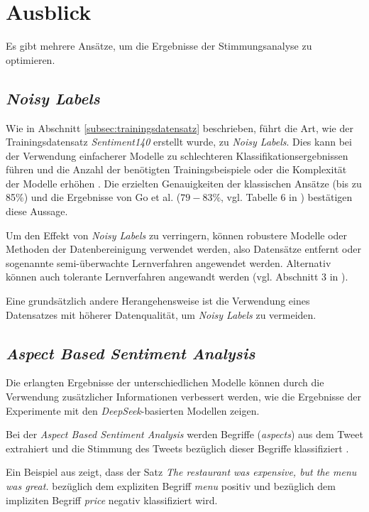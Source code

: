 \section{Ausblick}\label{sec:ausblick}

Es gibt mehrere Ansätze, um die Ergebnisse der Stimmungsanalyse zu optimieren.

\subsection{\textit{Noisy Labels}}
Wie in Abschnitt \ref{subsec:trainingsdatensatz} beschrieben, führt die Art, wie der Trainingsdatensatz \textit{Sentiment140} erstellt wurde, zu \textit{Noisy Labels}.
Dies kann bei der Verwendung einfacherer Modelle zu schlechteren Klassifikationsergebnissen führen und die Anzahl der benötigten Trainingsbeispiele oder die Komplexität der Modelle erhöhen \cite{NoisyLabel2014}.
Die erzielten Genauigkeiten der klassischen Ansätze (bis zu 85\%) und die Ergebnisse von  Go et al. ($79-83\%$, vgl. Tabelle 6 in \cite{go2009twitter}) bestätigen diese Aussage.

Um den Effekt von \textit{Noisy Labels} zu verringern, können robustere Modelle oder Methoden der Datenbereinigung verwendet werden, also Datensätze entfernt oder sogenannte semi-überwachte Lernverfahren angewendet werden. Alternativ können auch tolerante Lernverfahren angewandt werden (vgl. Abschnitt 3 in \cite{NoisyLabel2014}).

Eine grundsätzlich andere Herangehensweise ist die Verwendung eines Datensatzes mit höherer Datenqualität, um \textit{Noisy Labels} zu vermeiden.

\subsection{\textit{Aspect Based Sentiment Analysis}}

Die erlangten Ergebnisse der unterschiedlichen Modelle können durch die Verwendung zusätzlicher Informationen verbessert werden, wie die Ergebnisse der Experimente mit den \textit{DeepSeek}-basierten Modellen zeigen.

Bei der \textit{Aspect Based Sentiment Analysis} werden Begriffe (\textit{aspects}) aus dem Tweet extrahiert und die Stimmung des Tweets bezüglich dieser Begriffe klassifiziert \cite{Hua_2024}.

Ein Beispiel aus \cite{Hua_2024} zeigt, dass der Satz \glqq \textit{The restaurant was expensive, but the menu was great.}\grqq{} bezüglich dem expliziten Begriff \textit{menu} positiv und bezüglich dem impliziten Begriff \textit{price} negativ klassifiziert wird.

